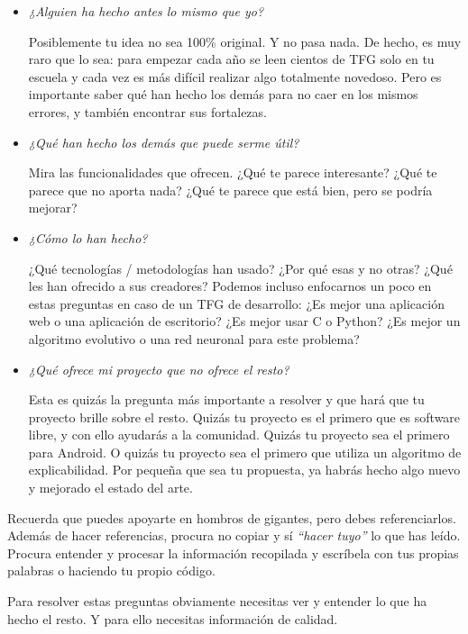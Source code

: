 \begin{itemize}
    \item \textit{¿Alguien ha hecho antes lo mismo que yo?}
    
Posiblemente tu idea no sea 100\% original. Y no pasa nada. De hecho, es muy raro que lo sea: para empezar cada año se leen cientos de TFG solo en tu escuela y cada vez es más difícil realizar algo totalmente novedoso. Pero es importante saber qué han hecho los demás para no caer en los mismos errores, y también encontrar sus fortalezas.

\item \textit{¿Qué han hecho los demás que puede serme útil?}

Mira las funcionalidades que ofrecen. ¿Qué te parece interesante? ¿Qué te parece que no aporta nada? ¿Qué te parece que está bien, pero se podría mejorar?

\item \textit{¿Cómo lo han hecho?} 

¿Qué tecnologías / metodologías han usado? ¿Por qué esas y no otras? ¿Qué les han ofrecido a sus creadores? Podemos incluso enfocarnos un poco en estas preguntas en caso de un TFG de desarrollo: ¿Es mejor una aplicación web o una aplicación de escritorio? ¿Es mejor usar C o Python? ¿Es mejor un algoritmo evolutivo o una red neuronal para este problema?

\item \textit{¿Qué ofrece mi proyecto que no ofrece el resto?} 

Esta es quizás la pregunta más importante a resolver y que hará que tu proyecto brille sobre el resto. Quizás tu proyecto es el primero que es software libre, y con ello ayudarás a la comunidad. Quizás tu proyecto sea el primero para Android. O quizás tu proyecto sea el primero que utiliza un algoritmo de explicabilidad. Por pequeña que sea tu propuesta, ya habrás hecho algo nuevo y mejorado el estado del arte.

\end{itemize}

Recuerda que puedes apoyarte en hombros de gigantes, pero debes referenciarlos. Además de hacer referencias, procura no copiar y sí {\it ``hacer tuyo''} lo que has leído. Procura entender y procesar la información recopilada y escríbela con tus propias palabras o haciendo tu propio código.

Para resolver estas preguntas obviamente necesitas ver y entender lo que ha hecho el resto. Y para ello necesitas información de calidad.

